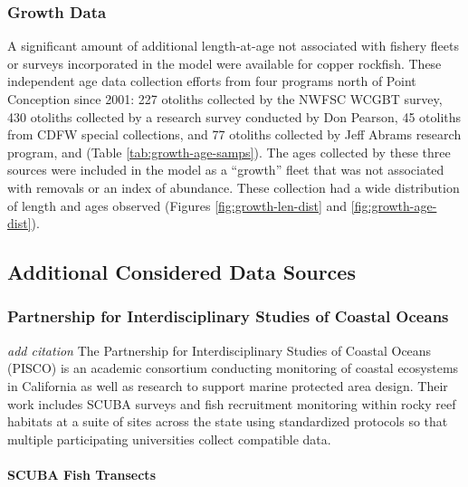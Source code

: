 \documentclass[11pt,
  english,
  letterpaper,
]{article}
\begin{document}
\hypertarget{growth-data}{%
\subsubsection{Growth Data}\label{growth-data}}

A significant amount of additional length-at-age not associated with fishery fleets or surveys incorporated in the model were available for copper rockfish. These independent age data collection efforts from four programs north of Point Conception since 2001: 227 otoliths collected by the NWFSC WCGBT survey, 430 otoliths collected by a research survey conducted by Don Pearson, 45 otoliths from CDFW special collections, and 77 otoliths collected by Jeff Abrams research program, and (Table \ref{tab:growth-age-samps}). The ages collected by these three sources were included in the model as a ``growth'' fleet that was not associated with removals or an index of abundance. These collection had a wide distribution of length and ages observed (Figures \ref{fig:growth-len-dist} and \ref{fig:growth-age-dist}).

\hypertarget{additional-considered-data-sources}{%
\subsection{Additional Considered Data Sources}\label{additional-considered-data-sources}}

\hypertarget{partnership-for-interdisciplinary-studies-of-coastal-oceans}{%
\subsubsection{Partnership for Interdisciplinary Studies of Coastal Oceans}\label{partnership-for-interdisciplinary-studies-of-coastal-oceans}}

\emph{add citation} The Partnership for Interdisciplinary Studies of Coastal Oceans (PISCO) is an academic consortium conducting monitoring of coastal ecosystems in California as well as research to support marine protected area design. Their work includes SCUBA surveys and fish recruitment monitoring within rocky reef habitats at a suite of sites across the state using standardized protocols so that multiple participating universities collect compatible data.

\hypertarget{scuba-fish-transects}{%
\paragraph{SCUBA Fish Transects}\label{scuba-fish-transects}}
\end{document}
